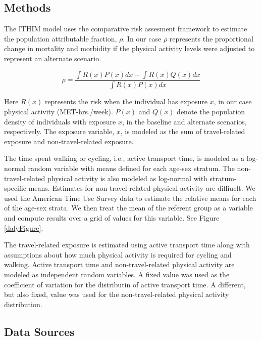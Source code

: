 \documentclass{bioinfo}
\newcommand{\af}{\rho}
\newcommand{\mets}{MET-hrs./week}
\begin{document}
\begin{methods}

\section{Methods}

The ITHIM model uses the comparative risk assesment framework to
estimate the population attributable fraction, $\af$.  In our case
$\af$ represents the proportional change in mortality and morbidity if
the physical activity levels were adjusted to represent an alternate
scenario.

\begin{equation}
\af = \frac{\int R(x)P(x) dx  - \int R(x)Q(x) dx }{\int R(x)P(x) dx}
\end{equation}

Here $R(x)$ represents the risk when the individual has exposure $x$,
in our case physical activity (\mets).  $P(x)$ and $Q(x)$ denote the
population density of individuals with exposure $x$, in the baseline
and alternate scenarios, respectively.  The exposure variable, $x$, is
modeled as the sum of travel-related exposure and non-travel-related
exposure.

The time spent walking or cycling, i.e., active transport time, is
modeled as a log-normal random variable with means defined for each
age-sex stratum.  The non-travel-related physical activity is also
modeled as log-normal with stratum-specific means.  Estimates for
non-travel-related physical activity are diffiuclt.  We used the
American Time Use Survey data to estimate the relative means for each
of the age-sex strata.  We then treat the mean of the referent group
as a variable and compute results over a grid of values for this
variable.  See Figure \ref{dalyFigure}.

The travel-related exposure is estimated using active transport time
along with assumptions about how much physical activity is required
for cycling and walking.  Active transport time and non-travel-related
physical activity are modeled as independent random variables.  A
fixed value was used as the coefficient of variation for the
distributin of active transport time. A different, but also fixed,
value was used for the non-travel-related physical activity
distribution.

\subsection{Data Sources}


\end{methods}
\end{document}
